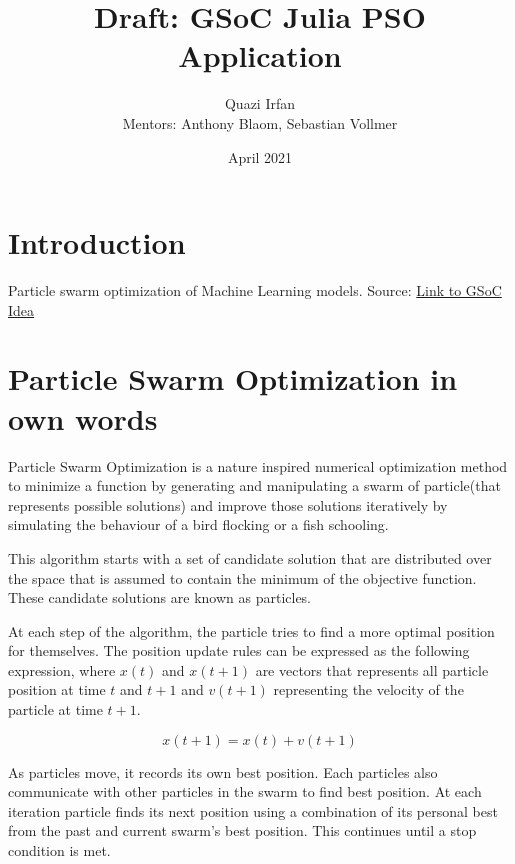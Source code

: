 \documentclass{article}
\title{Draft: GSoC Julia PSO Application}
\author{Quazi Irfan \\ Mentors: Anthony Blaom, Sebastian Vollmer}
\date{April 2021}
\begin{document}
\tableofcontents
\maketitle

\section{Introduction}

Particle swarm optimization of Machine Learning models. Source:
\href{https://julialang.org/jsoc/gsoc/MLJ/#Particle-swarm-optimization-of-machine-learning-models}{Link to GSoC Idea}

\section{Particle Swarm Optimization in own words}

Particle Swarm Optimization is a nature inspired numerical optimization method to minimize a function by generating and manipulating a swarm of particle(that represents possible solutions) and improve those solutions iteratively by simulating the behaviour of a bird flocking or a fish schooling.

This algorithm starts with a set of candidate solution that are distributed over the space that is assumed to contain the minimum of the objective function. These candidate solutions are known as particles.

At each step of the algorithm, the particle tries to find a more optimal position for themselves. The position update rules can be expressed as the following expression, where $x(t)$ and $x(t+1)$ are vectors that represents all particle position at time $t$ and $t+1$ and $v(t+1)$ representing the velocity of the particle at time $t+1$.

\begin{equation}
x(t+1) = x(t) + v(t+1)
\end{equation}

As particles move, it records its own best position. Each particles also communicate with other particles in the swarm to find best position. At each iteration particle finds its next position using a combination of its personal best from the past and current swarm's best position. This continues until a stop condition is met.
\end{document}
